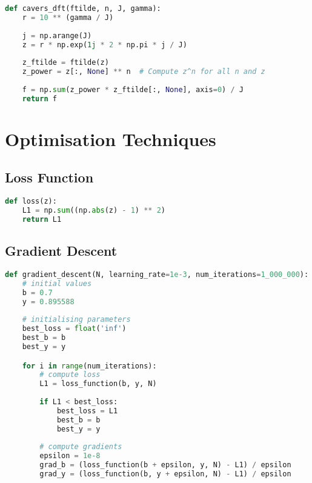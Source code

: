 \begin{appendices}
\begin{lstlisting}[language=Python, caption= Implementation of \citet{Cavers1978FFT} DFT NIZT (Equation \ref{equation:cavers_sum})]
def cavers_dft(ftilde, n, J, gamma):
    r = 10 ** (gamma / J)
    
    j = np.arange(J)
    z = r * np.exp(1j * 2 * np.pi * j / J)
    
    z_ftilde = ftilde(z)
    z_power = z[:, None] ** n  # Compute z^n for all n and z
    
    f = np.sum(z_power * z_ftilde[:, None], axis=0) / J
    return f
\end{lstlisting}

\newpage
\section{Optimisation Techniques}

\subsection{Loss Function}
\begin{lstlisting}[language=Python, caption= Implementation of \autoref{eq:loss_function} to quantify the deviation from the unit circle.]
def loss(z):
    L1 = np.sum((np.abs(z) - 1) ** 2)
    return L1
\end{lstlisting}

\subsection{Gradient Descent}
\begin{lstlisting}[language=Python, caption= Initial gradient descent setup as outlined in Algorithm \ref{algo:gd_l1}]
def gradient_descent(N, learning_rate=1e-3, num_iterations=1_000_000):
	# initial values
    b = 0.7
    y = 0.895588
    
    # initialising parameters
    best_loss = float('inf')
    best_b = b
    best_y = y

    for i in range(num_iterations):
        # compute loss
        L1 = loss_function(b, y, N)
        
        if L1 < best_loss:
            best_loss = L1
            best_b = b
            best_y = y
        
        # compute gradients 
        epsilon = 1e-8
        grad_b = (loss_function(b + epsilon, y, N) - L1) / epsilon
        grad_y = (loss_function(b, y + epsilon, N) - L1) / epsilon
        

\end{lstlisting}
\end{appendices}

